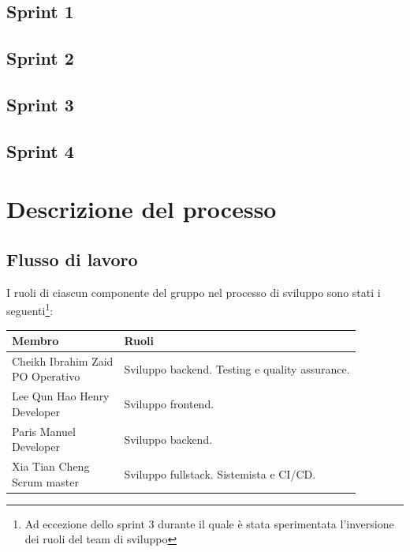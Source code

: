 \documentclass[11pt]{article}
\begin{document}
\subsection{Sprint 1}

\newpage

\subsection{Sprint 2}

\newpage

\subsection{Sprint 3}

\newpage

\subsection{Sprint 4}

\newpage


\newpage
\section{Descrizione del processo}

\subsection{Flusso di lavoro}
I ruoli di ciascun componente del gruppo nel processo di sviluppo sono stati i 
seguenti\footnote{Ad eccezione dello sprint 3 durante il quale è stata sperimentata l'inversione dei ruoli del team di sviluppo}:
\begin{center}
    \begin{tabular}{ | m{4cm} | m{10cm} | }
        \hline
        {\textbf{Membro}} & {\textbf{Ruoli}} \\
        \hline
        \makecell[cl]{Cheikh Ibrahim Zaid\\{\footnotesize PO Operativo}} & Sviluppo backend. Testing e quality assurance. \\ 
        \hline
        \makecell[cl]{Lee Qun Hao Henry\\{\footnotesize Developer}} & Sviluppo frontend. \\ 
        \hline
        \makecell[cl]{Paris Manuel\\{\footnotesize Developer}} & Sviluppo backend. \\ 
        \hline
        \makecell[cl]{Xia Tian Cheng\\{\footnotesize Scrum master}} & Sviluppo fullstack. Sistemista e CI/CD. \\ 
        \hline
    \end{tabular}
\end{center}
\end{document}
